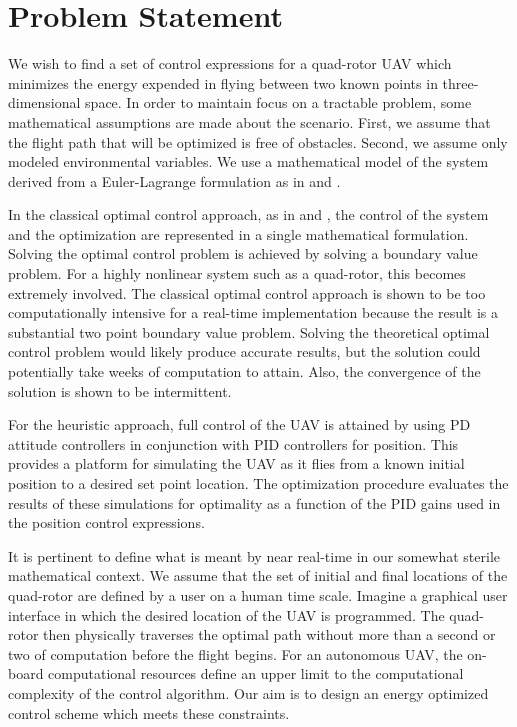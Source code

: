 
\chapter{Problem Statement} %

\label{Chapter2} %




We wish to find a set of control expressions for a quad-rotor UAV which minimizes the energy expended in flying between two known points in three-dimensional space. In order to maintain focus on a tractable problem, some mathematical assumptions are made about the scenario. First, we assume that the flight path that will be optimized is free of obstacles. Second, we assume only modeled environmental variables. We use a mathematical model of the system derived from a Euler-Lagrange formulation as in \cite{bouabdallah2004pid} and \cite{Luukkonen}.


In the classical optimal control approach, as in \cite{lewis2012optimal} and \cite{BrysonHo69}, the control of the system and the optimization are represented in a single mathematical formulation. Solving the optimal control problem is achieved by solving a boundary value problem. For a highly nonlinear system such as a quad-rotor, this becomes extremely involved. The classical optimal control approach is shown to be too computationally intensive for a real-time implementation because the result is a substantial two point boundary value problem. Solving the theoretical optimal control problem would likely produce accurate results, but the solution could potentially take weeks of computation to attain. Also, the convergence of the solution is shown to be intermittent.

For the heuristic approach, full control of the UAV is attained by using PD attitude controllers in conjunction with PID controllers for position. This provides a platform for simulating the UAV as it flies from a known initial position to a desired set point location. The optimization procedure evaluates the results of these simulations for optimality as a function of the PID gains used in the position control expressions.

It is pertinent to define what is meant by near real-time in our somewhat sterile mathematical context. We assume that the set of initial and final locations of the quad-rotor are defined by a user on a human time scale. Imagine a graphical user interface in which the desired location of the UAV is programmed. The quad-rotor then physically traverses the optimal path without more than a second or two of computation before the flight begins. For an autonomous UAV, the on-board computational resources define an upper limit to the computational complexity of the control algorithm. Our aim is to design an energy optimized control scheme which meets these constraints.

